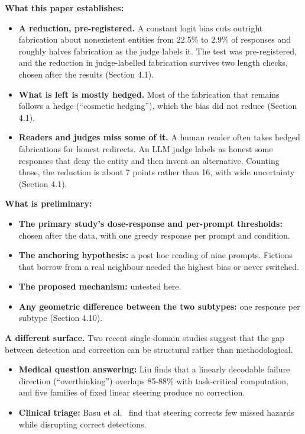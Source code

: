 \documentclass[11pt,letterpaper]{article}
\providecommand{\tightlist}{\setlength{\itemsep}{0pt}\setlength{\parskip}{0pt}}
\DeclareRobustCommand{\_}{\textunderscore\allowbreak}
\begin{document}
\textbf{What this paper establishes:}

\begin{itemize}
\tightlist
\item
  \textbf{A reduction, pre-registered.} A constant logit bias cuts outright fabrication about nonexistent entities from 22.5\% to 2.9\% of responses and roughly halves fabrication as the judge labels it. The test was pre-registered, and the reduction in judge-labelled fabrication survives two length checks, chosen after the results (Section 4.1).
\item
  \textbf{What is left is mostly hedged.} Most of the fabrication that remains follows a hedge (``cosmetic hedging''), which the bias did not reduce (Section 4.1).
\item
  \textbf{Readers and judges miss some of it.} A human reader often takes hedged fabrications for honest redirects. An LLM judge labels as honest some responses that deny the entity and then invent an alternative. Counting those, the reduction is about 7 points rather than 16, with wide uncertainty (Section 4.1).
\end{itemize}

\textbf{What is preliminary:}

\begin{itemize}
\tightlist
\item
  \textbf{The primary study's dose-response and per-prompt thresholds:} chosen after the data, with one greedy response per prompt and condition.
\item
  \textbf{The anchoring hypothesis:} a post hoc reading of nine prompts. Fictions that borrow from a real neighbour needed the highest bias or never switched.
\item
  \textbf{The proposed mechanism:} untested here.
\item
  \textbf{Any geometric difference between the two subtypes:} one response per subtype (Section 4.10).
\end{itemize}

\textbf{A different surface.} Two recent single-domain studies suggest that the gap between detection and correction can be structural rather than methodological.

\begin{itemize}
\tightlist
\item
  \textbf{Medical question answering:} Liu \cite{liu2026decodable} finds that a linearly decodable failure direction (``overthinking'') overlaps 85-88\% with task-critical computation, and five families of fixed linear steering produce no correction.
\item
  \textbf{Clinical triage:} Basu et al.~\cite{basu2026interpretability} find that steering corrects few missed hazards while disrupting correct detections.
\end{itemize}
\end{document}
